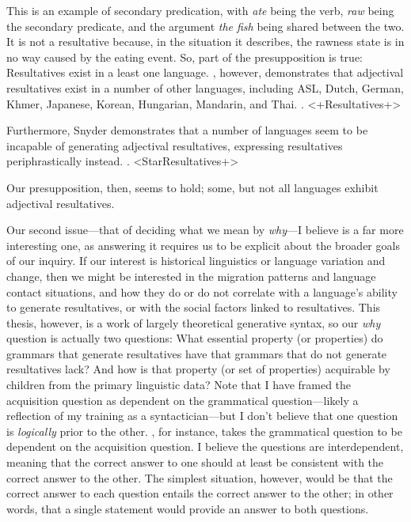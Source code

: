 \documentclass[MilwayThesis]{subfiles}
\begin{document}
This is an example of secondary predication, with \textit{ate} being the verb, \textit{raw} being the secondary predicate, and the argument \textit{the fish} being shared between the two.
It is not a resultative because, in the situation it describes, the rawness state is in no way caused by the eating event.
So, part of the presupposition is true: Resultatives exist in a least one language.
\textcite{snyder1995language,snyder2001nature}, however, demonstrates that adjectival resultatives exist in a number of other languages, including ASL, Dutch, German, Khmer, Japanese, Korean, Hungarian, Mandarin, and Thai.
\ex. <+Resultatives+>

Furthermore, Snyder demonstrates that a number of languages seem to be incapable of generating adjectival resultatives, expressing resultatives periphrastically instead.
\ex. <StarResultatives+>

Our presupposition, then, seems to hold; some, but not all languages exhibit adjectival resultatives.

Our second issue---that of deciding what we mean by \textit{why}---I believe is a far more interesting one, as answering it requires us to be explicit about the broader goals of our inquiry.
If our interest is historical linguistics or language variation and change, then we might be interested in the migration patterns and language contact situations, and how they do or do not correlate with a language's ability to generate resultatives, or with the social factors linked to resultatives.
This thesis, however, is a work of largely theoretical generative syntax, so our \textit{why} question is actually two questions: What essential property (or properties) do grammars that generate resultatives have that grammars that do not generate resultatives lack? And how is that property (or set of properties) acquirable by children from the primary linguistic data?
Note that I have framed the acquisition question as dependent on the grammatical question---likely a reflection of my training as a syntactician---but I don't believe that one question is \textit{logically} prior to the other.
\textcite{snyder1995language,snyder2001nature}, for instance, takes the grammatical question to be dependent on the acquisition question.
I believe the questions are interdependent, meaning that the correct answer to one should at least be consistent with the correct answer to the other.
The simplest situation, however, would be that the correct answer to each question entails the correct answer to the other; in other words, that a single statement would provide an answer to both questions.
\end{document}

